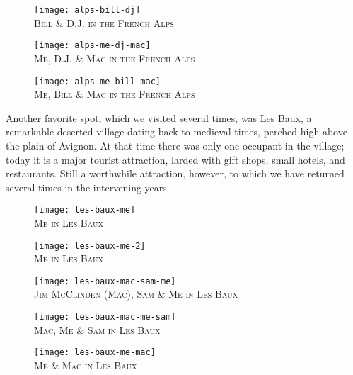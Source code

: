 \documentclass[../m3y]{subfiles}
\begin{document}
\begin{figure}[h]
\centering
\texttt{[image: alps-bill-dj]}\\
\medskip
{\newtimes\textsc{Bill \& D.J. in the French Alps}}
\end{figure}

\begin{figure}[h]
\centering
\texttt{[image: alps-me-dj-mac]}\\
\medskip
    {\newtimes\textsc{Me, D.J. \& Mac in the French Alps}}
\end{figure}

\begin{figure}[h]
\centering
\texttt{[image: alps-me-bill-mac]}\\
\medskip
{\newtimes\textsc{Me, Bill \& Mac in the French Alps}}
\end{figure}

Another favorite spot, which we visited several times, was Les Baux, a remarkable deserted village dating back to medieval times, perched high above the plain of Avignon.  At that time there was only one occupant in the village; today it is a major tourist attraction, larded with gift shops, small hotels, and restaurants. Still a worthwhile attraction, however, to which we have returned several times in the intervening years.

\begin{figure}[h]
\centering
\texttt{[image: les-baux-me]}\\
\medskip
{\newtimes\textsc{Me in Les Baux}}
\end{figure}

\begin{figure}[h]
\centering
\texttt{[image: les-baux-me-2]}\\
\medskip
{\newtimes\textsc{Me in Les Baux}}
\end{figure}

\begin{figure}[h]
\centering
\texttt{[image: les-baux-mac-sam-me]}\\
\medskip
{\newtimes\textsc{Jim McClinden (Mac), Sam \& Me in Les Baux}}
\end{figure}

\begin{figure}[h]
\centering
\texttt{[image: les-baux-mac-me-sam]}\\
\medskip
{\newtimes\textsc{Mac, Me \& Sam in Les Baux}}
\end{figure}

\begin{figure}[h]
\centering
\texttt{[image: les-baux-me-mac]}\\
\medskip
{\newtimes\textsc{Me \& Mac in Les Baux}}
\end{figure}
\end{document}
